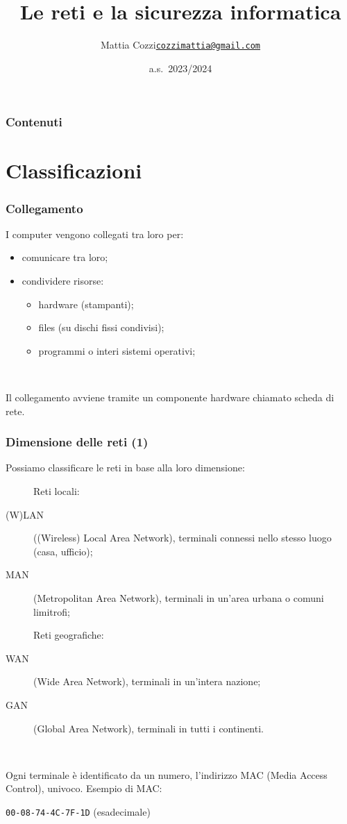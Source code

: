 \documentclass[]{beamer}
\title{Le reti e la sicurezza informatica}
\author{Mattia Cozzi\newline\href{mailto:cozzimattia@gmail.com}{\texttt{cozzimattia@gmail.com}}}
\date{a.s.~2023/2024}
\begin{document}
\begin{frame}
  \titlepage
\end{frame}


\begin{frame}
\frametitle{Contenuti}
\tableofcontents
\end{frame}



\section{Classificazioni}


\begin{frame}
\frametitle{Collegamento}
I computer vengono collegati tra loro per:
\begin{itemize}
  \item comunicare tra loro;\pause
  \item condividere risorse:\pause
  \begin{itemize}
    \item hardware (stampanti);\pause
    \item files (su dischi fissi condivisi);\pause
    \item programmi o interi sistemi operativi;\pause
  \end{itemize}
\end{itemize}

~

Il collegamento avviene tramite un componente hardware chiamato \alert{scheda di rete}.
\end{frame}


\begin{frame}
\frametitle{Dimensione delle reti (1)}
Possiamo classificare le reti in base alla loro \alert<1>{dimensione}:\pause
\begin{description}
  \item[] Reti locali:
  \item[(W)LAN] ((Wireless) Local Area Network), terminali connessi nello stesso luogo (casa, ufficio);\pause
  \item[MAN] (Metropolitan Area Network), terminali in un'area urbana o comuni limitrofi;\pause
  \item[] Reti geografiche:
  \item[WAN] (Wide Area Network), terminali in un'intera nazione;\pause
  \item[GAN] (Global Area Network), terminali in tutti i continenti.
\end{description}\pause

~

Ogni terminale è identificato da un numero, l'indirizzo MAC (Media Access Control), univoco. Esempio di MAC:
\begin{center}
  \texttt{00-08-74-4C-7F-1D} (esadecimale)
\end{center}
\end{frame}
\end{document}
